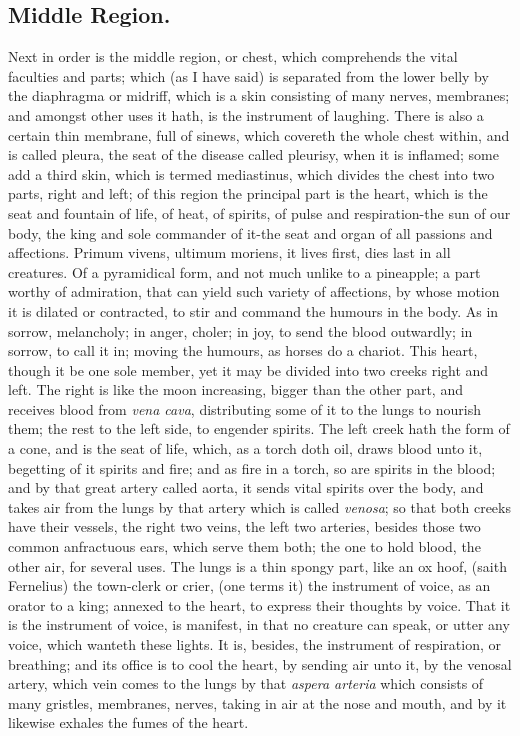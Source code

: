 {\subsection{Middle Region.}
Next in order is the middle region, or chest, which
comprehends the vital faculties and parts; which (as I have said) is
separated from the lower belly by the diaphragma or midriff, which is a
skin consisting of many nerves, membranes; and amongst other uses it
hath, is the instrument of laughing. There is also a certain thin
membrane, full of sinews, which covereth the whole chest within, and is
called pleura, the seat of the disease called pleurisy, when it is
inflamed; some add a third skin, which is termed mediastinus, which
divides the chest into two parts, right and left; of this region the
principal part is the heart, which is the seat and fountain of life, of
heat, of spirits, of pulse and respiration-the sun of our body, the
king and sole commander of it-the seat and organ of all passions and
affections. Primum vivens, ultimum moriens, it lives first, dies last
in all creatures. Of a pyramidical form, and not much unlike to a
pineapple; a part worthy of  admiration, that can yield such
variety of affections, by whose motion it is dilated or contracted, to
stir and command the humours in the body. As in sorrow, melancholy; in
anger, choler; in joy, to send the blood outwardly; in sorrow, to call
it in; moving the humours, as horses do a chariot. This heart, though
it be one sole member, yet it may be divided into two creeks right and
left. The right is like the moon increasing, bigger than the other
part, and receives blood from \emph{vena cava}, distributing some of it to
the lungs to nourish them; the rest to the left side, to engender
spirits. The left creek hath the form of a cone, and is the seat of
life, which, as a torch doth oil, draws blood unto it, begetting of it
spirits and fire; and as fire in a torch, so are spirits in the blood;
and by that great artery called aorta, it sends vital spirits over the
body, and takes air from the lungs by that artery which is called
\emph{venosa}; so that both creeks have their vessels, the right two veins,
the left two arteries, besides those two common anfractuous ears, which
serve them both; the one to hold blood, the other air, for several
uses. The lungs is a thin spongy part, like an ox hoof, (saith
Fernelius) the town-clerk or crier, (one terms it) the
instrument of voice, as an orator to a king; annexed to the heart, to
express their thoughts by voice. That it is the instrument of voice, is
manifest, in that no creature can speak, or utter any voice, which
wanteth these lights. It is, besides, the instrument of respiration, or
breathing; and its office is to cool the heart, by sending air unto it,
by the venosal artery, which vein comes to the lungs by that \emph{aspera
arteria} which consists of many gristles, membranes, nerves, taking in
air at the nose and mouth, and by it likewise exhales the fumes of the
heart.

}

